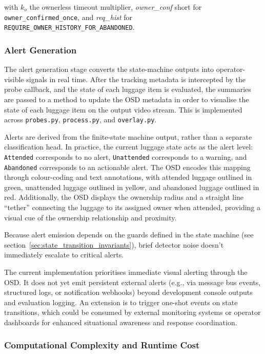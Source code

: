 \noindent with $k_o$ the ownerless timeout multiplier,
\textit{owner\_conf} short for \texttt{owner\_confirmed\_once}, and
\textit{req\_hist} for \texttt{REQUIRE\_OWNER\_HISTORY\_FOR\_ABANDONED}.

\subsubsection{Alert Generation}
\label{sec:alert_generation}

The alert generation stage converts the state-machine outputs into
operator-visible signals in real time. After the tracking metadata is
intercepted by the probe callback, and the state of each luggage item is
evaluated, the summaries are passed to a method to update the OSD metadata in
order to visualise the state of each luggage item on the output video stream.
This is implemented across \texttt{probes.py}, \texttt{process.py}, and
\texttt{overlay.py}.

Alerts are derived from the finite-state machine output, rather than a separate
classification head. In practice, the current luggage state acts as the alert
level: \texttt{Attended} corresponds to no alert, \texttt{Unattended}
corresponds to a warning, and \texttt{Abandoned} corresponds to an actionable
alert. The OSD encodes this mapping through colour-coding and text annotations,
with attended luggage outlined in green, unattended luggage outlined in yellow,
and abandoned luggage outlined in red. Additionally, the OSD displays the
ownership radius and a straight line ``tether'' connecting the luggage to its
assigned owner when attended, providing a visual cue of the ownership
relationship and proximity.

Because alert emission depends on the guards defined in the state machine (see
section~\ref{sec:state_transition_invariants}), brief detector noise doesn't
immediately escalate to critical alerts.

The current implementation prioritises immediate visual alerting through the
OSD. It does not yet emit persistent external alerts (e.g., via message bus
events, structured logs, or notification webhooks) beyond development console
outputs and evaluation logging. An extension is to trigger one-shot events on
state transitions, which could be consumed by external monitoring systems or
operator dashboards for enhanced situational awareness and response
coordination.

\subsubsection{Computational Complexity and Runtime Cost}

